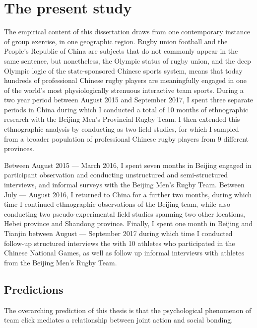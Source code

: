 \section{The present study}
The empirical content of this dissertation draws from one contemporary instance of group exercise, in one geographic region.  Rugby union football and the People's Republic of China are subjects that do not commonly appear in the same sentence, but nonetheless, the Olympic status of rugby union, and the deep Olympic logic of the state-sponsored Chinese sports system, means that today hundreds of professional Chinese rugby players are meaningfully engaged in one of the world's most physiologically strenuous interactive team sports.  During a two year period between August 2015 and September 2017, I spent three separate periods in China during which I conducted a total of 10 months of ethnographic research with the Beijing Men's Provincial Rugby Team. I then extended this ethnographic analysis by conducting as two field studies, for which I sampled from a broader population of professional Chinese rugby players from 9 different provinces.

Between August 2015 --- March 2016, I spent seven months in Beijing engaged in participant observation and conducting unstructured and semi-structured interviews, and informal surveys with the Beijing Men's Rugby Team. Between July --- August 2016, I returned to China for a further two months, during which time I continued ethnographic observations of the Beijing team, while also conducting two pseudo-experimental field studies spanning two other locations, Hebei province and Shandong province. Finally, I spent one month in Beijing and Tianjin between August --- September 2017 during which time I conducted follow-up structured interviews the with 10 athletes who participated in the Chinese National Games, as well as follow up informal interviews with athletes from the Beijing Men's Rugby Team.


\subsection{Predictions}

The overarching prediction of this thesis is that the psychological phenomenon of team click mediates a relationship between joint action and social bonding.

